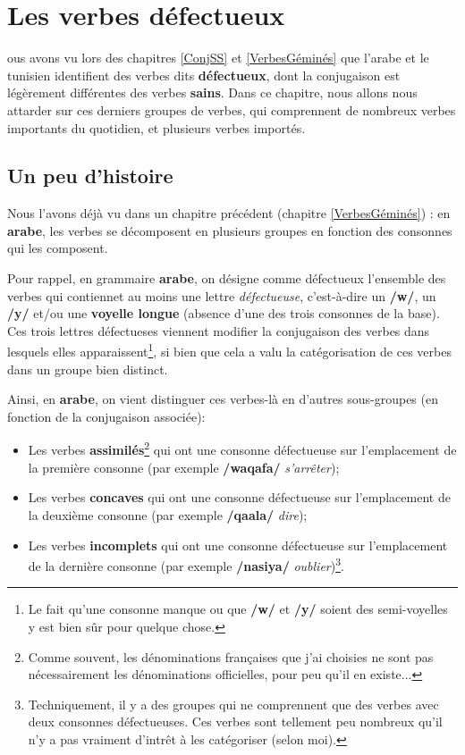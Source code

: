 \chapter{Les verbes défectueux}\label{VerbesDefectueux}
ous avons vu lors des chapitres \ref{ConjSS} et \ref{VerbesGéminés} que l'arabe et le tunisien identifient des verbes dits \textbf{défectueux}, dont la conjugaison est légèrement différentes des verbes \textbf{sains}. Dans ce chapitre, nous allons nous attarder sur ces derniers groupes de verbes, qui comprennent de nombreux verbes importants du quotidien, et plusieurs verbes importés.

\section{Un peu d'histoire}
Nous l'avons déjà vu dans un chapitre précédent (chapitre \ref{VerbesGéminés}) : en \textbf{arabe}, les verbes se décomposent en plusieurs groupes en fonction des consonnes qui les composent.

Pour rappel, en grammaire \textbf{arabe}, on désigne comme défectueux l'ensemble des verbes qui contiennet au moins une lettre \textit{défectueuse}, c'est-à-dire un \textbf{/w/}, un \textbf{/y/} et/ou une \textbf{voyelle longue} (absence d'une des trois consonnes de la base). Ces trois lettres défectueses viennent modifier la conjugaison des verbes dans lesquels elles apparaissent\footnote{Le fait qu'une consonne manque ou que \textbf{/w/} et \textbf{/y/} soient des semi-voyelles y est bien sûr pour quelque chose.}, si bien que cela a valu la catégorisation de ces verbes dans un groupe bien distinct.

Ainsi, en \textbf{arabe}, on vient distinguer ces verbes-là en d'autres sous-groupes (en fonction de la conjugaison associée): 
\begin{itemize}
    \item Les verbes \textbf{assimilés}\footnote{Comme souvent, les dénominations françaises que j'ai choisies ne sont pas nécessairement les dénominations officielles, pour peu qu'il en existe...}  qui ont une consonne défectueuse sur l'emplacement de la première consonne (par exemple \textbf{/waqafa/}  \textit{s'arrêter});
    \item Les verbes \textbf{concaves}  qui ont une consonne défectueuse sur l'emplacement de la deuxième consonne (par exemple \textbf{/qaala/}  \textit{dire});
    \item Les verbes \textbf{incomplets}  qui ont une consonne défectueuse sur l'emplacement de la dernière consonne (par exemple \textbf{/nasiya/}  \textit{oublier})\footnote{Techniquement, il y a des groupes qui ne comprennent que des verbes avec deux consonnes défectueuses. Ces verbes sont tellement peu nombreux qu'il n'y a pas vraiment d'intrêt à les catégoriser (selon moi).}.
\end{itemize}

